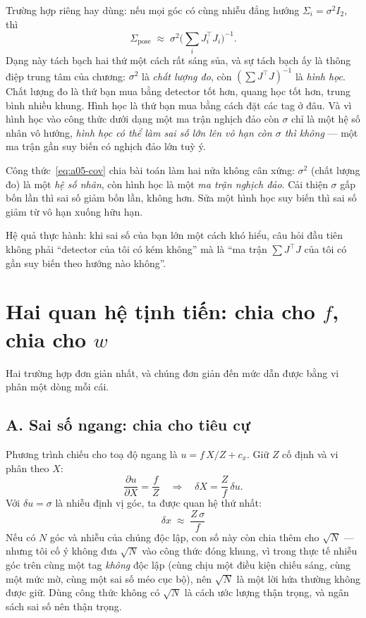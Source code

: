 \documentclass[../../marker.tex]{subfiles}
\begin{document}
Trường hợp riêng hay dùng: nếu mọi góc có cùng nhiễu đẳng hướng \(\Sigma_i = \sigma^2 I_2\), thì
\[
\Sigma_{\text{pose}} \;\approx\; \sigma^2 \Big(\sum_i J_i^{\top}J_i\Big)^{-1}.
\]
Dạng này tách bạch hai thứ một cách rất sáng sủa, và sự tách bạch ấy là thông điệp trung tâm của chương: \(\sigma^2\) là \emph{chất lượng đo}, còn \((\sum J^{\top}J)^{-1}\) là \emph{hình học}. Chất lượng đo là thứ bạn mua bằng detector tốt hơn, quang học tốt hơn, trung bình nhiều khung. Hình học là thứ bạn mua bằng cách đặt các tag ở đâu. Và vì hình học vào công thức dưới dạng một ma trận nghịch đảo còn \(\sigma\) chỉ là một hệ số nhân vô hướng, \emph{hình học có thể làm sai số lớn lên vô hạn còn \(\sigma\) thì không} --- một ma trận gần suy biến có nghịch đảo lớn tuỳ ý.

\begin{cannho}
Công thức~\eqref{eq:a05-cov} chia bài toán làm hai nửa không cân xứng: \(\sigma^2\) (chất lượng đo) là một \emph{hệ số nhân}, còn hình học là một \emph{ma trận nghịch đảo}. Cải thiện \(\sigma\) gấp bốn lần thì sai số giảm bốn lần, không hơn. Sửa một hình học suy biến thì sai số giảm từ vô hạn xuống hữu hạn.

Hệ quả thực hành: khi sai số của bạn lớn một cách khó hiểu, câu hỏi đầu tiên không phải ``detector của tôi có kém không'' mà là ``ma trận \(\sum J^{\top}J\) của tôi có gần suy biến theo hướng nào không''.
\end{cannho}

\section{Hai quan hệ tịnh tiến: chia cho \texorpdfstring{\(f\)}{f}, chia cho \texorpdfstring{\(w\)}{w}}

Hai trường hợp đơn giản nhất, và chúng đơn giản đến mức dẫn được bằng vi phân một dòng mỗi cái.

\subsection{A. Sai số ngang: chia cho tiêu cự}

Phương trình chiếu cho toạ độ ngang là \(u = f\,X/Z + c_x\). Giữ \(Z\) cố định và vi phân theo \(X\):
\[
\frac{\partial u}{\partial X} = \frac{f}{Z}
\quad\Longrightarrow\quad
\delta X = \frac{Z}{f}\,\delta u .
\]
Với \(\delta u = \sigma\) là nhiễu định vị góc, ta được quan hệ thứ nhất:
\begin{equation}
\boxed{\;\delta x \;\approx\; \frac{Z\,\sigma}{f}\;}
\label{eq:a05-lateral}
\end{equation}
Nếu có \(N\) góc và nhiễu của chúng độc lập, con số này còn chia thêm cho \(\sqrt{N}\) --- nhưng tôi cố ý không đưa \(\sqrt{N}\) vào công thức đóng khung, vì trong thực tế nhiễu góc trên cùng một tag \emph{không} độc lập (cùng chịu một điều kiện chiếu sáng, cùng một mức mờ, cùng một sai số méo cục bộ), nên \(\sqrt{N}\) là một lời hứa thường không được giữ. Dùng công thức không có \(\sqrt{N}\) là cách ước lượng thận trọng, và ngân sách sai số nên thận trọng.
\end{document}
